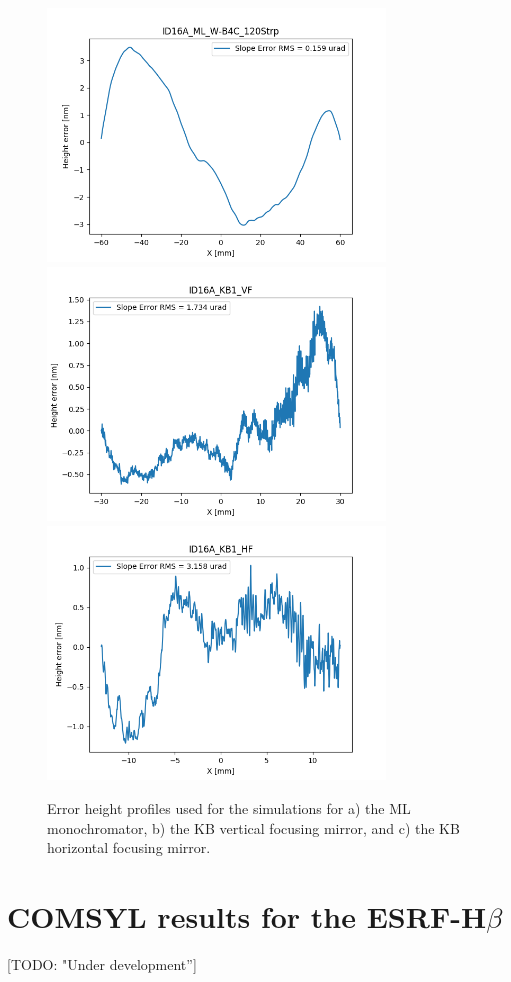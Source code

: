 \documentclass{iucr}              %
\newcommand{\todo}[1]{{\color{red}[TODO: "#1'']}}
\begin{document}
\begin{figure}\label{fig:metrology}
\includegraphics[width=0.8\textwidth]{GRAPHICS/ID16A_ML_W-B4C_120Strp.png}
\includegraphics[width=0.8\textwidth]{GRAPHICS/ID16A_KB1_VF.png}
\includegraphics[width=0.8\textwidth]{GRAPHICS/ID16A_KB1_HF.png}
\caption{Error height profiles used for the simulations for a) the ML monochromator, b) the KB vertical focusing mirror, and c) the KB horizontal focusing mirror.}
\end{figure}

\section{COMSYL results for the ESRF-H$\beta$}
\todo{Under development}




\end{document}
